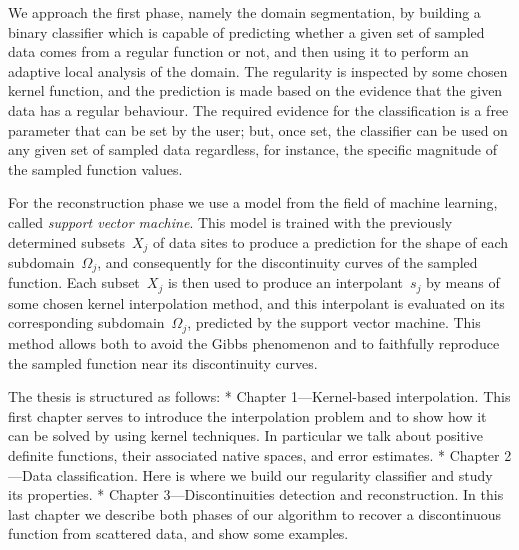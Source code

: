 We approach the first phase, namely the domain segmentation, by building a binary classifier which is capable of predicting whether a given set of sampled data comes from a regular function or not, and then using it to perform an adaptive local analysis of the domain.  The regularity is inspected by some chosen kernel function, and the prediction is made based on the evidence that the given data has a regular behaviour.  The required evidence for the classification is a free parameter that can be set by the user;  but, once set, the classifier can be used on any given set of sampled data regardless, for instance, the specific magnitude of the sampled function values.



For the reconstruction phase we use a model from the field of machine learning, called {\em support vector machine}.
This model is trained with the  previously determined subsets~$X_j$ of data sites to produce a prediction for the shape of each subdomain~$Ω_j$, and consequently for the discontinuity curves of the sampled function.  Each subset~$X_j$ is then used to produce an interpolant~$s_j$ by means of some chosen kernel interpolation method, and this interpolant is evaluated on its corresponding subdomain~$Ω_j$, predicted by the support vector machine.  This method allows  both to avoid the Gibbs phenomenon and to faithfully reproduce the sampled function near its discontinuity curves.



The thesis is structured as follows:
\begitems
* Chapter 1---Kernel-based interpolation.  This first chapter serves to introduce the interpolation problem and to show how it can be solved by using kernel techniques. In particular we talk about positive definite functions, their associated native spaces, and error estimates.
* Chapter 2---Data classification.  Here is where we build our regularity classifier and study its properties.
* Chapter 3---Discontinuities detection and reconstruction. In this last chapter we describe both phases of our algorithm to recover a discontinuous function from scattered data, and show some examples.
\enditems





